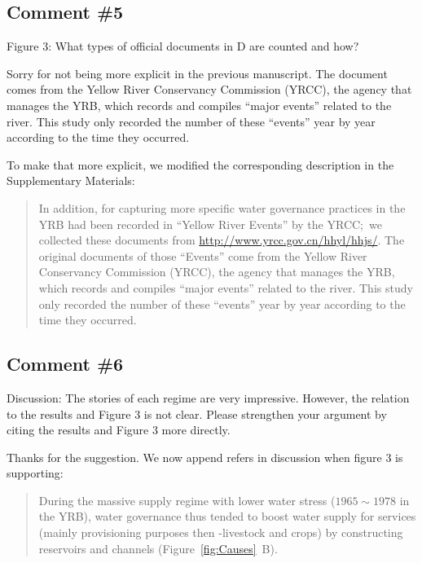 \subsection{Comment \#5}
\RC{} Figure 3: What types of official documents in D are counted and how?

\AR{} Sorry for not being more explicit in the previous manuscript. The document comes from the Yellow River Conservancy Commission (YRCC), the agency that manages the YRB, which records and compiles ``major events'' related to the river. This study only recorded the number of these ``events'' year by year according to the time they occurred.

\AR*{} To make that more explicit, we modified the corresponding description in the Supplementary Materials:

\begin{quote}
    In addition, for capturing more specific water governance practices in the YRB had been recorded in ``Yellow River Events'' by the YRCC;\ we collected these documents from \url{http://www.yrcc.gov.cn/hhyl/hhjs/}.
    The original documents of those ``Events'' come from the Yellow River Conservancy Commission (YRCC), the agency that manages the YRB, which records and compiles ``major events'' related to the river. This study only recorded the number of these ``events'' year by year according to the time they occurred.
\end{quote}

\subsection{Comment \#6}
\RC{} Discussion: The stories of each regime are very impressive. However, the relation to the results and Figure 3 is not clear. Please strengthen your argument by citing the results and Figure 3 more directly.

\AR{} Thanks for the suggestion. We now append refers in discussion when figure 3 is supporting:

\begin{quote}
    During the massive supply regime with lower water stress ($1965 \sim 1978$ in the YRB), water governance thus tended to boost water supply for services (mainly provisioning purposes then -livestock and crops) by constructing reservoirs and channels (Figure~\ref{fig:Causes}~B).
\end{quote}

